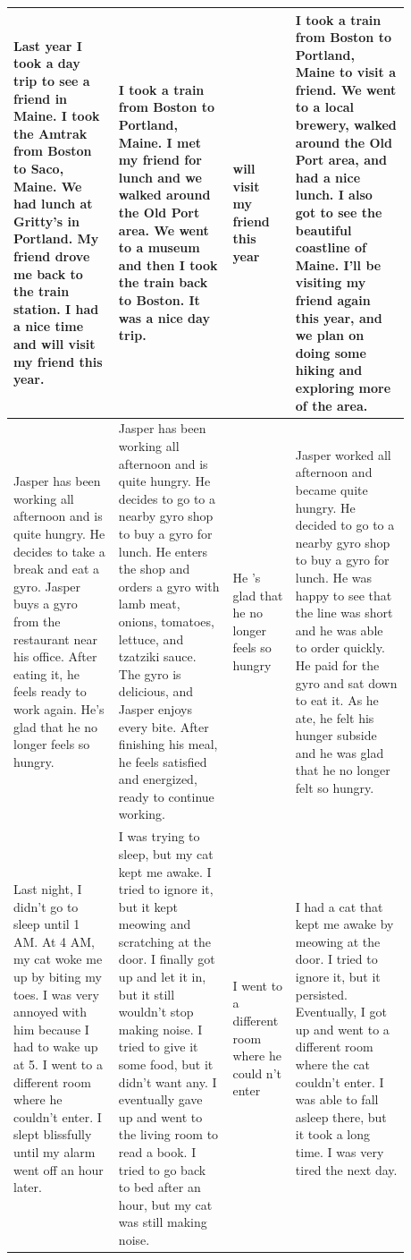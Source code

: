 \begin{table}[htp!]
\begin{tabular}{|p{0.24\linewidth}|p{0.26\linewidth}|p{0.12\linewidth}|p{0.26\linewidth}|}
Last year I took a day trip to see a friend in Maine. I took the Amtrak from Boston to Saco, Maine. We had lunch at Gritty's in Portland. My friend drove me back to the train station. I had a nice time and will visit my friend this year.
& I took a train from Boston to Portland, Maine. I met my friend for lunch and we walked around the Old Port area. We went to a museum and then I took the train back to Boston. It was a nice day trip.
& will visit my friend this year
& I took a train from Boston to Portland, Maine to visit a friend. We went to a local brewery, walked around the Old Port area, and had a nice lunch. I also got to see the beautiful coastline of Maine. I'll be visiting my friend again this year, and we plan on doing some hiking and exploring more of the area. \\ \hline

Jasper has been working all afternoon and is quite hungry. He decides to take a break and eat a gyro. Jasper buys a gyro from the restaurant near his office. After eating it, he feels ready to work again. He's glad that he no longer feels so hungry.
& Jasper has been working all afternoon and is quite hungry. He decides to go to a nearby gyro shop to buy a gyro for lunch. He enters the shop and orders a gyro with lamb meat, onions, tomatoes, lettuce, and tzatziki sauce. The gyro is delicious, and Jasper enjoys every bite. After finishing his meal, he feels satisfied and energized, ready to continue working.
& He 's glad that he no longer feels so hungry
& Jasper worked all afternoon and became quite hungry. He decided to go to a nearby gyro shop to buy a gyro for lunch. He was happy to see that the line was short and he was able to order quickly. He paid for the gyro and sat down to eat it. As he ate, he felt his hunger subside and he was glad that he no longer felt so hungry. \\ \hline

Last night, I didn't go to sleep until 1 AM. At 4 AM, my cat woke me up by biting my toes. I was very annoyed with him because I had to wake up at 5. I went to a different room where he couldn't enter. I slept blissfully until my alarm went off an hour later.
& I was trying to sleep, but my cat kept me awake. I tried to ignore it, but it kept meowing and scratching at the door. I finally got up and let it in, but it still wouldn't stop making noise. I tried to give it some food, but it didn't want any. I eventually gave up and went to the living room to read a book. I tried to go back to bed after an hour, but my cat was still making noise.
& I went to a different room where he could n't enter
& I had a cat that kept me awake by meowing at the door. I tried to ignore it, but it persisted. Eventually, I got up and went to a different room where the cat couldn't enter. I was able to fall asleep there, but it took a long time. I was very tired the next day. \\ \hline


\end{tabular}
\end{table}
